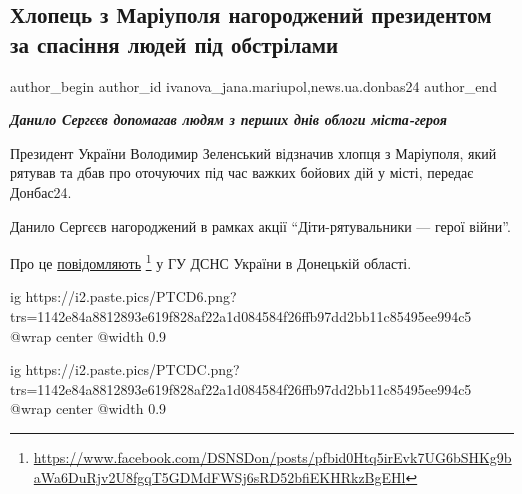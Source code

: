  
 
 
 
 
 
\subsection{Хлопець з Маріуполя нагороджений президентом за спасіння людей під обстрілами}
\label{sec:12_08_2022.stz.news.ua.donbas24.2.hlopec_z_mrpl_nagoroda_prezident_spasinnja_ljudej}
 
\ifcmt
 author_begin
   author_id ivanova_jana.mariupol,news.ua.donbas24
 author_end
\fi


\begin{center}
  \em\color{blue}\bfseries\Large
Данило Сергєєв допомагав людям з перших днів облоги міста-героя
\end{center}

Президент України Володимир Зеленський відзначив хлопця з Маріуполя, який
рятував та дбав про оточуючих під час важких бойових дій у місті, передає
Донбас24.

Данило Сергєєв нагороджений в рамках акції \enquote{Діти-рятувальники — герої війни}.

Про це \href{https://www.facebook.com/DSNSDon/posts/pfbid0Htq5irEvk7UG6bSHKg9baWa6DuRjv2U8fgqT5GDMdFWSj6sRD52bfiEKHRkzBgEHl}{повідомляють}%
\footnote{\url{https://www.facebook.com/DSNSDon/posts/pfbid0Htq5irEvk7UG6bSHKg9baWa6DuRjv2U8fgqT5GDMdFWSj6sRD52bfiEKHRkzBgEHl}}
у ГУ ДСНС України в Донецькій області.

\ifcmt
  ig https://i2.paste.pics/PTCD6.png?trs=1142e84a8812893e619f828af22a1d084584f26ffb97dd2bb11c85495ee994c5
  @wrap center
  @width 0.9
\fi

\ifcmt
  ig https://i2.paste.pics/PTCDC.png?trs=1142e84a8812893e619f828af22a1d084584f26ffb97dd2bb11c85495ee994c5
  @wrap center
  @width 0.9
\fi

